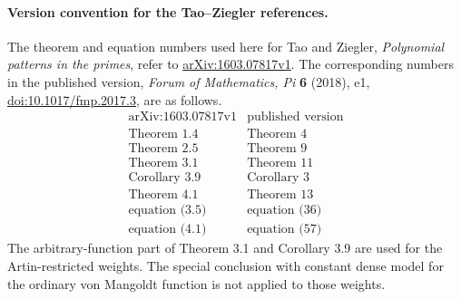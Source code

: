 \paragraph{Version convention for the Tao--Ziegler references.}
The theorem and equation numbers used here for Tao and Ziegler,
\emph{Polynomial patterns in the primes}, refer to
\href{https://arxiv.org/abs/1603.07817v1}{arXiv:1603.07817v1}.
The corresponding numbers in the published version,
\emph{Forum of Mathematics, Pi} \textbf{6} (2018), e1,
\href{https://doi.org/10.1017/fmp.2017.3}{doi:10.1017/fmp.2017.3},
are as follows.
\[
\begin{array}{c|c}
\text{arXiv:1603.07817v1}&\text{published version}\\\hline
\text{Theorem 1.4}&\text{Theorem 4}\\
\text{Theorem 2.5}&\text{Theorem 9}\\
\text{Theorem 3.1}&\text{Theorem 11}\\
\text{Corollary 3.9}&\text{Corollary 3}\\
\text{Theorem 4.1}&\text{Theorem 13}\\
\text{equation (3.5)}&\text{equation (36)}\\
\text{equation (4.1)}&\text{equation (57)}
\end{array}
\]
The arbitrary-function part of Theorem 3.1 and Corollary 3.9 are used
for the Artin-restricted weights. The special conclusion with constant
dense model for the ordinary von Mangoldt function is not applied to
those weights.
